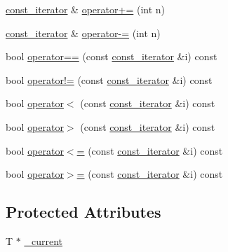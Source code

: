 \begin{DoxyCompactItemize}
\item 
\hyperlink{classVector_1_1const__iterator}{const\+\_\+iterator} \& \hyperlink{classVector_1_1const__iterator_a0adddda02db5aace233912940c8f8979_a0adddda02db5aace233912940c8f8979}{operator+=} (int n)
\item 
\hyperlink{classVector_1_1const__iterator}{const\+\_\+iterator} \& \hyperlink{classVector_1_1const__iterator_af223a63e9a0587781de597ef50f3b7db_af223a63e9a0587781de597ef50f3b7db}{operator-\/=} (int n)
\item 
bool \hyperlink{classVector_1_1const__iterator_a6bd4b35ce30423fa93de1109fac60efd_a6bd4b35ce30423fa93de1109fac60efd}{operator==} (const \hyperlink{classVector_1_1const__iterator}{const\+\_\+iterator} \&i) const
\item 
bool \hyperlink{classVector_1_1const__iterator_a18870100713906a04755d7269665a1ed_a18870100713906a04755d7269665a1ed}{operator!=} (const \hyperlink{classVector_1_1const__iterator}{const\+\_\+iterator} \&i) const
\item 
bool \hyperlink{classVector_1_1const__iterator_a88a32fe91bda0079a2f7da6f07171ca2_a88a32fe91bda0079a2f7da6f07171ca2}{operator$<$} (const \hyperlink{classVector_1_1const__iterator}{const\+\_\+iterator} \&i) const
\item 
bool \hyperlink{classVector_1_1const__iterator_af5064ab82341e26c1518b228acc0f824_af5064ab82341e26c1518b228acc0f824}{operator$>$} (const \hyperlink{classVector_1_1const__iterator}{const\+\_\+iterator} \&i) const
\item 
bool \hyperlink{classVector_1_1const__iterator_af0cd8adfd475f12608d743dc2ec6624f_af0cd8adfd475f12608d743dc2ec6624f}{operator$<$=} (const \hyperlink{classVector_1_1const__iterator}{const\+\_\+iterator} \&i) const
\item 
bool \hyperlink{classVector_1_1const__iterator_a353332912e5cdc2c95339bd9f2735ee7_a353332912e5cdc2c95339bd9f2735ee7}{operator$>$=} (const \hyperlink{classVector_1_1const__iterator}{const\+\_\+iterator} \&i) const
\end{DoxyCompactItemize}
\subsection*{Protected Attributes}
\begin{DoxyCompactItemize}
\item 
T $\ast$ \hyperlink{classVector_1_1const__iterator_aad73aad5797a6ff013553310ee35b7cd_aad73aad5797a6ff013553310ee35b7cd}{\+\_\+current}
\end{DoxyCompactItemize}


